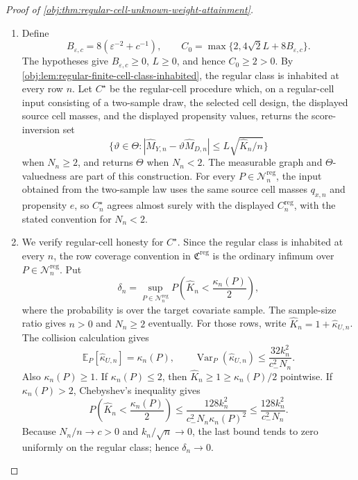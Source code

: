 \begin{proof}[Proof of \cref{obj:thm:regular-cell-unknown-weight-attainment}]
\begin{enumerate}
\item Define
\[
B_{\varepsilon,c}=8(\varepsilon^{-2}+c^{-1}),\qquad
C_0=\max\{2,4\sqrt2L+8B_{\varepsilon,c}\}.
\]
The hypotheses give \(B_{\varepsilon,c}\ge0\), \(L\ge0\), and hence \(C_0\ge2>0\). By \cref{obj:lem:regular-finite-cell-class-inhabited}, the regular class is inhabited at every row \(n\). Let \(C^\star\) be the regular-cell procedure which, on a regular-cell input consisting of a two-sample draw, the selected cell design, the displayed source cell masses, and the displayed propensity values, returns the score-inversion set
\[
\{\vartheta\in\Theta:
|\widehat M_{Y,n}-\vartheta\widehat M_{D,n}|
\le L\sqrt{\widehat K_n/n}\}
\]
when \(N_n\ge2\), and returns \(\Theta\) when \(N_n<2\). The measurable graph and \(\Theta\)-valuedness are part of this construction. For every \(P\in\mathcal N_n^{\mathrm{reg}}\), the input obtained from the two-sample law uses the same source cell masses \(q_{x,n}\) and propensity \(e\), so \(C^\star_n\) agrees almost surely with the displayed \(C_n^{\mathrm{reg}}\), with the stated convention for \(N_n<2\). %

\item We verify regular-cell honesty for \(C^\star\). Since the regular class is inhabited at every \(n\), the row coverage convention in \(\mathfrak C^{\mathrm{reg}}\) is the ordinary infimum over \(P\in\mathcal N_n^{\mathrm{reg}}\). Put
\[
\delta_n=\sup_{P\in\mathcal N_n^{\mathrm{reg}}}
P\!\left(\widehat K_n<\frac{\kappa_n(P)}2\right),
\]
where the probability is over the target covariate sample. The sample-size ratio gives \(n>0\) and \(N_n\ge2\) eventually. For those rows, write \(\widehat K_n=1+\widehat\kappa_{U,n}\). The collision calculation gives
\[
\mathbb E_P[\widehat\kappa_{U,n}]=\kappa_n(P),\qquad
\operatorname{Var}_P(\widehat\kappa_{U,n})
\le \frac{32k_n^2}{c_-^2N_n}.
\]
Also \(\kappa_n(P)\ge1\). If \(\kappa_n(P)\le2\), then \(\widehat K_n\ge1\ge\kappa_n(P)/2\) pointwise. If \(\kappa_n(P)>2\), Chebyshev's inequality gives
\[
P\!\left(\widehat K_n<\frac{\kappa_n(P)}2\right)
\le
\frac{128k_n^2}{c_-^2N_n\kappa_n(P)^2}
\le
\frac{128k_n^2}{c_-^2N_n}.
\]
Because \(N_n/n\to c>0\) and \(k_n/\sqrt n\to0\), the last bound tends to zero uniformly on the regular class; hence \(\delta_n\to0\).


\end{enumerate}
\end{proof}
